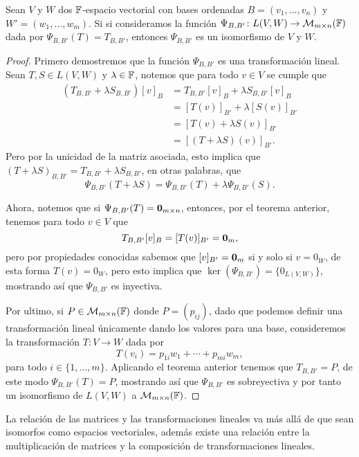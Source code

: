 \begin{teor}\label{teo:isomTrMat}
  Sean $V$ y $W$ dos $\mathbb{F}$-espacio vectorial con bases ordenadas $B = (v_1,\ldots,v_n)$ y $W' = (w_1,\ldots,w_m)$. Si si consideramos la función $\Psi_{B,B'}\colon L(V,W) \to \mathcal{M}_{m\times n}(\mathbb{F})$ dada por $\Psi_{B,B'}(T) = T_{B,B'}$, entonces $\Psi_{B,B'}$ es un isomorfismo de $V$ y $W$.
\end{teor}
\begin{proof}
  Primero demostremos que la función $\Psi_{B,B'}$ es una transformación lineal. Sean $T, S \in L(V,W)$ y $\lambda \in \mathbb{F}$, notemos que para todo $v \in V$ se cumple que
  \begin{align*}
    (T_{B,B'} + \lambda S_{B,B'})[v]_B &= T_{B,B'}[v]_B + \lambda S_{B,B'} [v]_B \\
      &= [T(v)]_{B'} + \lambda [S(v)]_{B'} \\
      &= [T(v) + \lambda S(v)]_{B'} \\
      &= [ (T + \lambda S)(v)]_{B'}.
  \end{align*}
  Pero por la unicidad de la matriz asociada, esto implica que $(T + \lambda S)_{B,B'} = T_{B,B'} + \lambda S_{B,B'}$, en otras palabras, que
  \[ \Psi_{B,B'}(T + \lambda S) = \Psi_{B,B'}(T) + \lambda \Psi_{B,B'}(S). \]

  Ahora, notemos que si $\Psi_{B,B'}(T) = \mathbf{0}_{m\times n}$, entonces, por el teorema anterior, tenemos para todo $v \in V$ que  
    \[ T_{B,B'}[v]_B  = [T(v)]_{B'} = \mathbf{0}_m,\]
  pero por propiedades conocidas sabemos que $[v]_{B'} = \mathbf{0}_m$ si y solo si $v = 0_W$, de esta forma $T(v) = 0_W$, pero esto implica que $\ker(\Psi_{B,B'}) = \{  0_{L(V,W)} \}$, mostrando así que $\Psi_{B,B'}$ es inyectiva.

  Por ultimo, si $P \in \mathcal{M}_{m\times n}(\mathbb{F})$ donde $P = (p_{ij})$, dado que podemos definir una transformación lineal únicamente dando los valores para una base, consideremos la transformación $T\colon V \to W$ dada por
  \[ T(v_i) =  p_{1i}w_1 + \cdots + p_{mi}w_m, \]
  para todo $i \in \{1,\ldots,m\}$. Aplicando el teorema anterior tenemos que $T_{B,B'} = P$, de este modo $\Psi_{B,B'}(T) = P$, mostrando así que $\Psi_{B,B'}$ es sobreyectiva y por tanto un isomorfismo de $L(V,W)$ a $\mathcal{M}_{m\times n}(\mathbb{F})$.
\end{proof}

La relación de las matrices y las transformaciones lineales va más allá de que sean isomorfos como espacios vectoriales, además existe una relación entre la multiplicación de matrices y la composición de transformaciones lineales.

